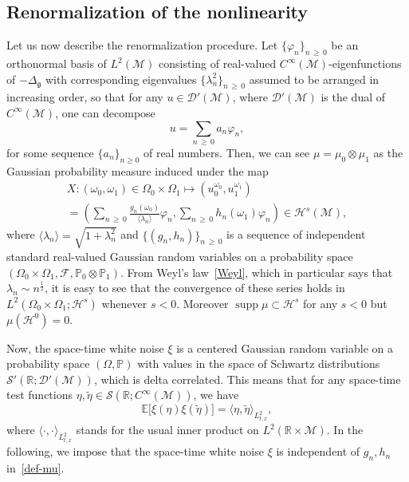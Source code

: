 \documentclass[AHL,Unicode,longabstracts,published]{cedram}
\newcommand{\R}{\mathbb{R}}
\newcommand{\E}{\mathbb{E}}
\newcommand{\Prob}{\mathbb{P}}
\DeclareMathOperator*{\supp}{supp}
\newcommand{\F}{\mathcal{F}}
\renewcommand{\S}{\mathcal{S}}
\newcommand{\Dp}{\mathcal{D}'}
\newcommand{\M}{\mathcal{M}}
\renewcommand{\H}{\mathcal{H}}
\newcommand{\g}{\mathfrak{g}}
\newcommand{\ld}{\lambda}
\newcommand{\Dlg}{\Delta_{\g}}
\renewcommand{\o}{\omega}
\renewcommand{\O}{\Omega}
\newcommand{\jb}[1] {\langle #1 \rangle}
\begin{document}
\subsection{Renormalization of the nonlinearity}
Let us now describe the renormalization procedure. Let $\{\varphi_n\}_{n\,\geq\,0}$ be an orthonormal basis of $L^2(\M)$ consisting of real-valued $C^\infty(\M)$-eigenfunctions of $-\Dlg$ with corresponding eigenvalues $\{\lambda_n^2\}_{n\,\geq\,0}$ assumed to be arranged in increasing order, so that for any $u\in\Dp(\M)$, where $\Dp(\M)$ is the dual of $C^{\infty}(\M)$, one can decompose
\begin{equation*}
u = \sum_{n\,\geq\,0}a_n\varphi_n,
\end{equation*}
for some sequence $\{a_n\}_{n\geq 0}$ of real numbers. Then, we can see $\mu =\mu_0\otimes \mu_1$ as the Gaussian probability measure induced under the map
\begin{multline}\label{def-mu}
X : (\o_0,\o_1) \in \O_0\times\O_1 \longmapsto \left(u_0^{\o_0}, u_1^{\o_1}\right)\\
 = \left(\sum_{n\,\ge\,0} \frac{g_{n}(\o_0)}{\jb{\lambda_n}}\varphi_n,
\sum_{n\,\ge\,0} h_{n}(\o_1)\varphi_n\right)\in\H^s(\M),
\end{multline}
where $\jb{\lambda_n} = \sqrt{1+\lambda_n^2}$ and $\{(g_{n}, h_{n})\}_{n\,\ge\,0}$ is a sequence of independent standard real-valued Gaussian random variables on a probability space $(\O_0\times \O_1, \F, \Prob_0\otimes\Prob_1)$. From Weyl's law~\eqref{Weyl}, which in particular says that $\ld_n \sim n^\frac{1}{2}$, it is easy to see that the convergence of these series holds in $L^2(\O_0\times\O_1;\H^s)$ whenever $s<0$. Moreover $\supp \mu \subset \H^s$ for any $s<0$ but $\mu(\H^0)=0$.

Now, the space-time white noise $\xi$ is a centered Gaussian random variable on a probability space $(\O,\Prob)$ with values in the space of Schwartz distributions $\S'(\R;\Dp(\M))$, which is delta correlated. This means that for any space-time test functions $\eta,\widetilde{\eta}\in \S(\R;C^{\infty}(\M))$, we have
\begin{equation*}
\E\big[\xi(\eta)\xi(\widetilde{\eta})\big] = \langle \eta,\widetilde{\eta}\rangle_{L^2_{t,x}},
\end{equation*}
where $\langle \cdot,\cdot\rangle_{L^2_{t,x}}$ stands for the usual inner product on $L^2(\R\times\M)$. In the following, we impose that the space-time white noise $\xi$ is independent of $g_n,h_n$ in~\eqref{def-mu}.
\end{document}
